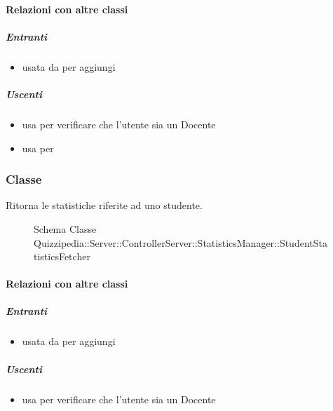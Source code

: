 \paragraph{Relazioni con altre classi}
\subparagraph{Entranti}
\begin{itemize}
\item usata da  per aggiungi
\end{itemize}
\subparagraph{Uscenti}
\begin{itemize}
\item usa  per verificare che l'utente sia un Docente
\item usa  per 
\end{itemize}
\subsubsection{Classe }
Ritorna le statistiche riferite ad uno studente.
\begin{figure}[H]
\centering
\noindent{}
\caption[Schema Classe StudentStatisticsFetcher]{Schema Classe Quizzipedia::Server::ControllerServer::StatisticsManager::StudentStatisticsFetcher}
\end{figure}
\paragraph{Relazioni con altre classi}
\subparagraph{Entranti}
\begin{itemize}
\item usata da  per aggiungi
\end{itemize}
\subparagraph{Uscenti}
\begin{itemize}
\item usa  per verificare che l'utente sia un Docente
\end{itemize}
